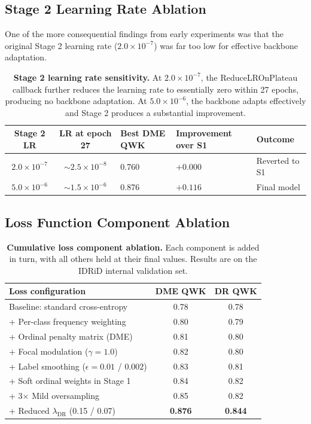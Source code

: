 \documentclass[12pt,a4paper]{article}
\begin{document}
\subsection{Stage 2 Learning Rate Ablation}

One of the more consequential findings from early experiments was that the original Stage 2 learning rate ($2.0 \times 10^{-7}$) was far too low for effective backbone adaptation.

\begin{table}[H]
\centering
\small
\caption{\textbf{Stage 2 learning rate sensitivity.} At $2.0 \times 10^{-7}$, the ReduceLROnPlateau callback further reduces the learning rate to essentially zero within 27 epochs, producing no backbone adaptation. At $5.0 \times 10^{-6}$, the backbone adapts effectively and Stage 2 produces a substantial improvement.}
\begin{tabular}{|c|c|p{2.5cm}|p{3cm}|l|}
\hline
\textbf{Stage 2 LR} & \textbf{LR at epoch 27} & \textbf{Best DME QWK} & \textbf{Improvement over S1} & \textbf{Outcome} \\
\hline
$2.0 \times 10^{-7}$ & $\sim 2.5 \times 10^{-8}$ & 0.760 & $+0.000$ & Reverted to S1 \\
$5.0 \times 10^{-6}$ & $\sim 1.5 \times 10^{-6}$ & 0.876 & $+0.116$ & Final model \\
\hline
\end{tabular}
\end{table}

\subsection{Loss Function Component Ablation}

\begin{table}[H]
\centering
\small
\caption{\textbf{Cumulative loss component ablation.} Each component is added in turn, with all others held at their final values. Results are on the IDRiD internal validation set.}
\begin{tabular}{|l|c|c|}
\hline
\textbf{Loss configuration} & \textbf{DME QWK} & \textbf{DR QWK} \\
\hline
Baseline: standard cross-entropy & 0.78 & 0.78 \\
+ Per-class frequency weighting & 0.80 & 0.79 \\
+ Ordinal penalty matrix (DME) & 0.81 & 0.80 \\
+ Focal modulation ($\gamma = 1.0$) & 0.82 & 0.80 \\
+ Label smoothing ($\epsilon = 0.01$ / $0.002$) & 0.83 & 0.81 \\
+ Soft ordinal weights in Stage 1 & 0.84 & 0.82 \\
+ 3$\times$ Mild oversampling & 0.85 & 0.82 \\
+ Reduced $\lambda_{\text{DR}}$ (0.15 / 0.07) & \textbf{0.876} & \textbf{0.844} \\
\hline
\end{tabular}
\end{table}
\end{document}
